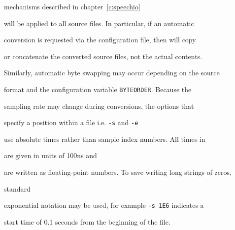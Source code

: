 mechanisms described in chapter~\ref{c:speechio}


will be applied to all source files.  In particular, if an automatic


conversion is requested via the configuration file, then  will copy


or concatenate the converted source files, not the actual contents.


Similarly, automatic byte swapping may occur depending on the source


format and the configuration variable \texttt{BYTEORDER}. Because the


sampling rate may change during conversions, the options that 


specify a position within a file i.e. \texttt{-s} and \texttt{-e}


use absolute times rather than sample index numbers.  All times in \HTK\


are given in units of 100ns and


are written as floating-point numbers. To save writing long strings of zeros, 


standard 


exponential notation may be used, for example \texttt{-s 1E6} indicates a


start time of 0.1 seconds from the beginning of the file.





